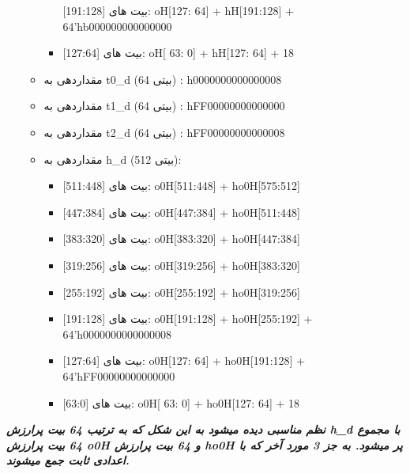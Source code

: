 \begin{itemize}
\begin{itemize}
\begin{itemize}
	      	      	      بیت های [191:128]:	oH[127: 64] + hH[191:128] + 64'hb000000000000000
	      	      	\item
	      	      	      بیت های [127:64]:	oH[ 63:  0] + hH[127: 64] + 18
	      	      \end{itemize}
	      	\item
	      	      مقداردهی به t0\_d (64 بیتی) : h0000000000000008
	      	\item
	      	      مقداردهی به t1\_d (64 بیتی) : hFF00000000000000
	      	\item
	      	      مقداردهی به t2\_d (64 بیتی) : hFF00000000000008
	      	\item
	      	      مقداردهی به h\_d (512 بیتی):
	      	      \begin{itemize}
	      	      	\item
	      	      	      بیت های [511:448]: 	o0H[511:448] + ho0H[575:512]
	      	      	\item
	      	      	      بیت های [447:384]:  	o0H[447:384] + ho0H[511:448]
	      	      	\item
	      	      	      بیت های [383:320]:	o0H[383:320] + ho0H[447:384]
	      	      	\item
	      	      	      بیت های [319:256]:	o0H[319:256] + ho0H[383:320]
	      	      	\item
	      	      	      بیت های [255:192]:	o0H[255:192] + ho0H[319:256]
	      	      	\item
	      	      	      بیت های [191:128]:	o0H[191:128] + ho0H[255:192] + 64'h0000000000000008
	      	      	\item
	      	      	      بیت های [127:64]:	o0H[127: 64] + ho0H[191:128] + 64'hFF00000000000000
	      	      	\item
	      	      	      بیت های [63:0]:		o0H[ 63:  0] + ho0H[127: 64] + 18
	      	      \end{itemize}
	      \end{itemize}
\end{itemize}
\textit{
	\textbf{نظم مناسبی دیده میشود به این شکل که به ترتیب 64 بیت پرارزش h\_d با مجموع 64 بیت پرارزش o0H و 64 بیت پرارزش ho0H پر میشود. به جز 3 مورد آخر که با اعدادی ثابت جمع میشوند.
}}

